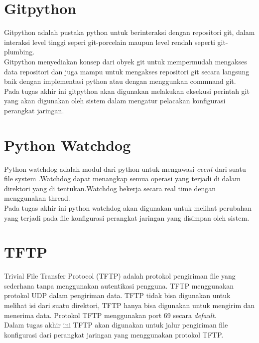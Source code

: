        	\section{Gitpython}
            Gitpython adalah pustaka python untuk berinteraksi dengan repositori git, dalam interaksi level tinggi seperi git-porcelain maupun level rendah seperti git-plumbing.\\ 
            \indent Gitpython menyediakan konsep dari obyek git untuk mempermudah mengakses data repositori dan juga mampu untuk mengakses repositori git secara langsung baik dengan implementasi python atau dengan menggunkan commnand git.\cite{about_gitpython} \\
            \indent Pada tugas akhir ini gitpython akan digunakan melakukan eksekusi perintah git yang akan digunakan oleh sistem dalam mengatur pelacakan konfigurasi perangkat jaringan.\\
            
        \section{Python Watchdog}
            Python watchdog adalah modul dari python untuk mengawasi \textit{event} dari suatu file system .Watchdog dapat menangkap semua operasi yang terjadi di dalam direktori yang di tentukan.Watchdog bekerja secara real time dengan menggunakan thread.\cite{watchdog_python} \\     
            \indent Pada tugas akhir ini python watchdog akan digunakan untuk melihat perubahan yang terjadi pada file konfigurasi perangkat jaringan yang disimpan oleh sistem.\\
        
        \section{TFTP}
        	Trivial File Transfer Protocol (TFTP) adalah protokol pengiriman file yang sederhana tanpa menggunakan autentikasi pengguna. TFTP menggunakan protokol UDP dalam pengiriman data. TFTP tidak bisa digunakan untuk melihat isi dari suatu direktori, TFTP hanya bisa digunakan untuk mengirim dan menerima data\cite{tftp}. Protokol TFTP menggunakan port 69 secara \textit{default}.\\
        	\indent Dalam tugas akhir ini TFTP akan digunakan untuk jalur pengiriman file konfigurasi dari perangkat jaringan yang menggunakan protokol TFTP.
        	
